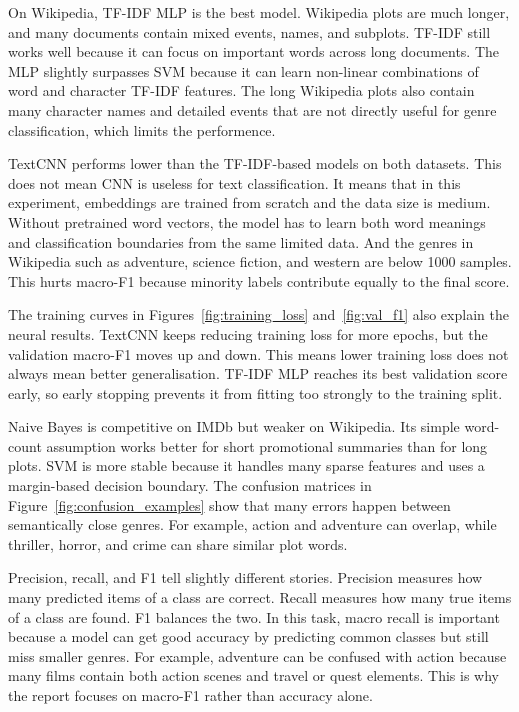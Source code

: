 \documentclass[12pt,a4paper]{article}
\begin{document}
On Wikipedia, TF-IDF MLP is the best model. Wikipedia plots are much longer, and many documents contain mixed events, names, and subplots. TF-IDF still works well because it can focus on important words across long documents. The MLP slightly surpasses SVM because it can learn non-linear combinations of word and character TF-IDF features. The long Wikipedia plots also contain many character names and detailed events that are not directly useful for genre classification, which limits the performence.

TextCNN performs lower than the TF-IDF-based models on both datasets. This does not mean CNN is useless for text classification. It means that in this experiment, embeddings are trained from scratch and the data size is medium. Without pretrained word vectors, the model has to learn both word meanings and classification boundaries from the same limited data. And the genres in Wikipedia such as adventure, science fiction, and western are below 1000 samples. This hurts macro-F1 because minority labels contribute equally to the final score.

The training curves in Figures~\ref{fig:training_loss} and~\ref{fig:val_f1} also explain the neural results. TextCNN keeps reducing training loss for more epochs, but the validation macro-F1 moves up and down. This means lower training loss does not always mean better generalisation. TF-IDF MLP reaches its best validation score early, so early stopping prevents it from fitting too strongly to the training split.

Naive Bayes is competitive on IMDb but weaker on Wikipedia. Its simple word-count assumption works better for short promotional summaries than for long plots. SVM is more stable because it handles many sparse features and uses a margin-based decision boundary. The confusion matrices in Figure~\ref{fig:confusion_examples} show that many errors happen between semantically close genres. For example, action and adventure can overlap, while thriller, horror, and crime can share similar plot words.

Precision, recall, and F1 tell slightly different stories. Precision measures how many predicted items of a class are correct. Recall measures how many true items of a class are found. F1 balances the two. In this task, macro recall is important because a model can get good accuracy by predicting common classes but still miss smaller genres. For example, adventure can be confused with action because many films contain both action scenes and travel or quest elements. This is why the report focuses on macro-F1 rather than accuracy alone.
\end{document}
